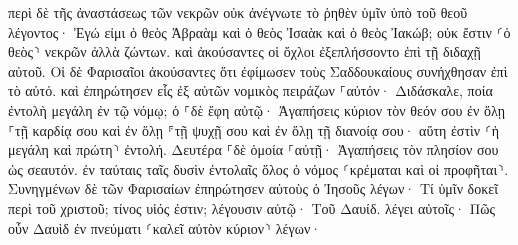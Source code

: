 \documentclass{openreader}
\begin{document}
περὶ δὲ τῆς ἀναστάσεως τῶν νεκρῶν οὐκ ἀνέγνωτε τὸ ῥηθὲν ὑμῖν ὑπὸ τοῦ θεοῦ λέγοντος· 
Ἐγώ εἰμι ὁ θεὸς Ἀβραὰμ καὶ ὁ θεὸς Ἰσαὰκ καὶ ὁ θεὸς Ἰακώβ; οὐκ ἔστιν ⸂ὁ θεὸς⸃ νεκρῶν ἀλλὰ ζώντων. 
καὶ ἀκούσαντες οἱ ὄχλοι ἐξεπλήσσοντο ἐπὶ τῇ διδαχῇ αὐτοῦ. 
Οἱ δὲ Φαρισαῖοι ἀκούσαντες ὅτι ἐφίμωσεν τοὺς Σαδδουκαίους συνήχθησαν ἐπὶ τὸ αὐτό. 
καὶ ἐπηρώτησεν εἷς ἐξ αὐτῶν νομικὸς πειράζων ⸀αὐτόν· 
Διδάσκαλε, ποία ἐντολὴ μεγάλη ἐν τῷ νόμῳ; 
ὁ ⸀δὲ ἔφη αὐτῷ· Ἀγαπήσεις κύριον τὸν θεόν σου ἐν ὅλῃ ⸀τῇ καρδίᾳ σου καὶ ἐν ὅλῃ ⸁τῇ ψυχῇ σου καὶ ἐν ὅλῃ τῇ διανοίᾳ σου· 
αὕτη ἐστὶν ⸂ἡ μεγάλη καὶ πρώτη⸃ ἐντολή. 
Δευτέρα ⸀δὲ ὁμοία ⸀αὐτῇ· Ἀγαπήσεις τὸν πλησίον σου ὡς σεαυτόν. 
ἐν ταύταις ταῖς δυσὶν ἐντολαῖς ὅλος ὁ νόμος ⸂κρέμαται καὶ οἱ προφῆται⸃. 
Συνηγμένων δὲ τῶν Φαρισαίων ἐπηρώτησεν αὐτοὺς ὁ Ἰησοῦς 
λέγων· Τί ὑμῖν δοκεῖ περὶ τοῦ χριστοῦ; τίνος υἱός ἐστιν; λέγουσιν αὐτῷ· Τοῦ Δαυίδ. 
λέγει αὐτοῖς· Πῶς οὖν Δαυὶδ ἐν πνεύματι ⸂καλεῖ αὐτὸν κύριον⸃ λέγων· 
\end{document}
